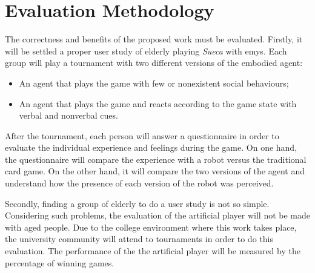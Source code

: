 \section{Evaluation Methodology} \label{sec:evaluation}

The correctness and benefits of the proposed work must be evaluated.
Firstly, it will be settled a proper user study of elderly playing \emph{Sueca} with \gls{emys}.
Each group will play a tournament with two different versions of the embodied agent:
\begin{itemize}
\item An agent that plays the game with few or nonexistent social behaviours;
\item An agent that plays the game and reacts according to the game state with verbal and nonverbal cues.
\end{itemize}
After the tournament, each person will answer a questionnaire in order to evaluate the individual experience and feelings during the game.
On one hand, the questionnaire will compare the experience with a robot versus the traditional card game.
On the other hand, it will compare the two versions of the agent and understand how the presence of each version of the robot was perceived.

Secondly, finding a group of elderly to do a user study is not so simple.
Considering such problems, the evaluation of the artificial player will not be made with aged people.
Due to the college environment where this work takes place, the university community will attend to tournaments in order to do this evaluation.
The performance of the the artificial player will be measured by the percentage of winning games.